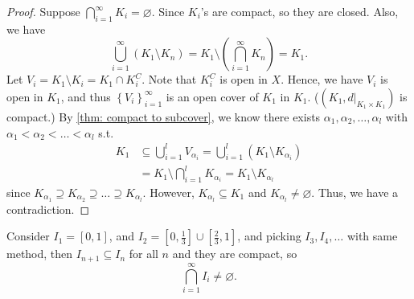 \begin{proof}
    Suppose \(\bigcap_{i=1}^{\infty} K_i = \varnothing  \). Since \(K_i\)'s are compact, so they are closed. Also, we have 
    \[
        \bigcup_{i=1}^{\infty} \left( K_1 \setminus K_n \right) = K_1 \setminus \left( \bigcap_{i=1}^{\infty} K_n \right) = K_1.
    \]  
    Let \(V_i = K_1 \setminus K_i = K_1 \cap K_i^C\). Note that \(K_i^C\) is open in \(X\). Hence, we have \(V_i\) is open in \(K_1\), and thus \(\left\{ V_i \right\}_{i=1}^{\infty}  \) is an open cover of \(K_1\) in \(K_1\). (\((K_1, d\vert_{K_1 \times K_1})\) is compact.) By \autoref{thm: compact to subcover}, we know there exists \(\alpha _1, \alpha _2, \dots , \alpha _l\) with \(\alpha _1 < \alpha _2 < \dots < \alpha _l\) s.t. 
    \begin{align*}
        K_1 &\subseteq \bigcup_{i=1}^{l} V_{\alpha _i} = \bigcup_{i=1}^{l} \left( K_1 \setminus K_{\alpha _i} \right) \\
            &= K_1 \setminus \bigcap_{i=1}^l K_{\alpha _i} = K_1 \setminus K_{\alpha _l} 
    \end{align*} since \(K_{\alpha _1} \supseteq K_{\alpha _2} \supseteq \dots \supseteq K_{\alpha _l}\). However, \(K_{\alpha _l} \subseteq K_1\) and \(K_{\alpha _l} \neq \varnothing \). Thus, we have a contradiction.  
\end{proof}

\begin{eg}
    Consider \(I_1 = [0, 1]\), and \(I_2 = [0, \frac{1}{3}] \cup [\frac{2}{3}, 1]\), and picking \(I_3, I_4, \dots \) with same method, then \(I_{n+1} \subseteq I_n\) for all \(n\) and they are compact, so
    \[
        \bigcap_{i=1}^{\infty} I_i \neq \varnothing . 
    \]      
\end{eg}

